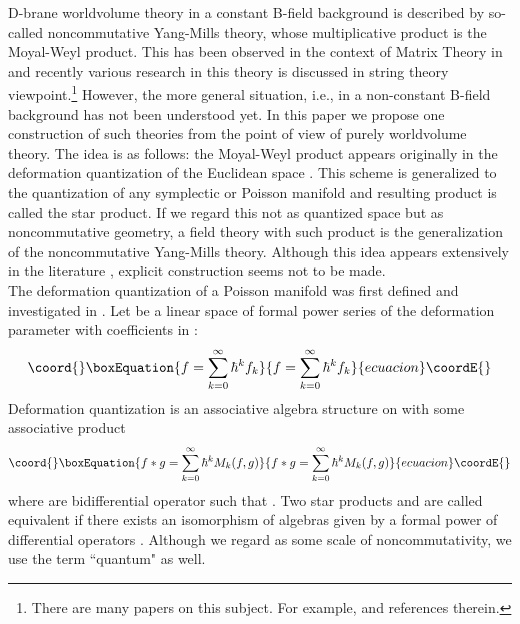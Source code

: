 \documentclass[10pt,a4paper]{article}
\def\h{\hbar}
\begin{document}
D-brane worldvolume theory in a constant B-field background is described by so-called noncommutative Yang-Mills theory, whose multiplicative product is the Moyal-Weyl product. This has been observed in the context of Matrix Theory in \cite{CDS}\cite{DH} and recently various research in this theory is discussed in string theory viewpoint.\footnote{
There are many papers on this subject. For example, \cite{SW}\cite{ALL} and references therein.
} However, the more general situation, i.e., in a non-constant B-field background has not been understood yet. In this paper we propose one construction of such theories from the point of view of purely worldvolume theory. The idea is as follows: the Moyal-Weyl product appears originally in the deformation quantization of the Euclidean space \coordHE{}. This scheme is generalized to the quantization of any symplectic or Poisson manifold and resulting product is called the star product. If we regard this not as quantized space but as noncommutative geometry, a field theory with such product is the generalization of the noncommutative Yang-Mills theory. Although this idea appears extensively in the literature \cite{HGC}, explicit construction seems not to be made.\\


The deformation quantization of a Poisson manifold \coordHE{} was first defined and investigated in \cite{Ko}.  Let \myHighlight{$Z=C^\infty(M)[[\h]]$}\coordHE{} be a linear space of formal power series of the deformation parameter \myHighlight{$\h$}\coordHE{} with coefficients in \coordHE{}:
\begin{equation}\coord{}\boxEquation{
 f=\sum_{k=0}^\infty\h^kf_k
}{
 f=\sum_{k=0}^\infty\h^kf_k
}{ecuacion}\coordE{}\end{equation}
Deformation quantization is an associative algebra structure on \coordHE{} with some associative product \myHighlight{$*$}\coordHE{}
\begin{equation}\coord{}\boxEquation{
 f*g=\sum_{k=0}^\infty \h^k M_k(f,g)
}{
 f*g=\sum_{k=0}^\infty \h^k M_k(f,g)
}{ecuacion}\coordE{}\end{equation}
where \coordHE{} are bidifferential operator such that \coordHE{}. Two star products \coordHE{} and  \coordHE{} are called equivalent if there exists an isomorphism of algebras \coordHE{} given by a formal power of differential operators \myHighlight{$T=T_0+\h T_1+\cdots$}\coordHE{}. Although we regard \myHighlight{$\h$}\coordHE{} as some scale of noncommutativity, we use the term ``quantum" as well. \\
\end{document}
